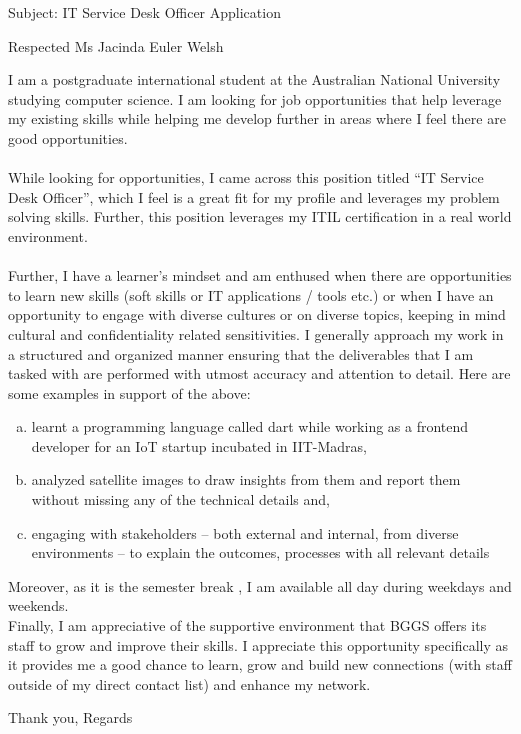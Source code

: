 \documentclass{letter}
\begin{document}
\begin{letter}{Subject: IT Service Desk Officer Application }
\opening{Respected Ms Jacinda Euler Welsh}
I am a postgraduate international student at the Australian National University studying computer science. I am looking for job opportunities that help leverage my existing skills while helping me develop further in areas where I feel there are good opportunities.\\ \\
While looking for opportunities, I came across this position titled “IT Service Desk Officer”, which I feel is a great fit for my profile and leverages my problem solving skills. Further, this position leverages my ITIL certification in a real world environment. \\ \\
Further, I have a learner’s mindset and am enthused when there are opportunities to learn new skills (soft skills or IT applications / tools etc.)  or when I have an opportunity to engage with diverse cultures or on diverse topics, keeping in mind cultural and confidentiality related sensitivities. I generally approach my work in a structured and organized manner ensuring that the deliverables that I am tasked with are performed with utmost accuracy and attention to detail. Here are some examples in support of the above:
\begin{enumerate}[(a)]
	\item learnt a programming language called dart while working as a frontend developer for an IoT startup incubated in IIT-Madras, 
	\item analyzed satellite images to draw insights from them and report them without missing any of the technical details and,
	\item engaging with stakeholders – both external and internal, from diverse environments – to explain the outcomes, processes with all relevant details 
\end{enumerate}
 Moreover, as it is the semester break , I am available all day during weekdays and weekends.
\\Finally, I am appreciative of the supportive environment that BGGS offers its staff to grow and improve their skills. I appreciate this opportunity specifically as it provides me a good chance to learn, grow and build new connections (with staff outside of my direct contact list) and enhance my network.

\closing{Thank you, Regards}
\end{letter}
\end{document}

